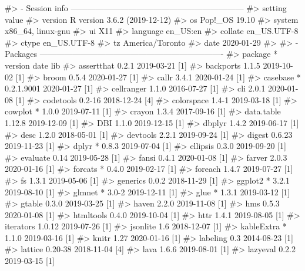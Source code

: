 \documentclass[
]{jss}
\begin{document}
\begin{CodeChunk}

\begin{CodeOutput}
#> - Session info ---------------------------------------------------------------
#>  setting  value                       
#>  version  R version 3.6.2 (2019-12-12)
#>  os       Pop!_OS 19.10               
#>  system   x86_64, linux-gnu           
#>  ui       X11                         
#>  language en_US:en                    
#>  collate  en_US.UTF-8                 
#>  ctype    en_US.UTF-8                 
#>  tz       America/Toronto             
#>  date     2020-01-29                  
#> 
#> - Packages -------------------------------------------------------------------
#>  package     * version    date       lib
#>  assertthat    0.2.1      2019-03-21 [1]
#>  backports     1.1.5      2019-10-02 [1]
#>  broom         0.5.4      2020-01-27 [1]
#>  callr         3.4.1      2020-01-24 [1]
#>  casebase    * 0.2.1.9001 2020-01-27 [1]
#>  cellranger    1.1.0      2016-07-27 [1]
#>  cli           2.0.1      2020-01-08 [1]
#>  codetools     0.2-16     2018-12-24 [4]
#>  colorspace    1.4-1      2019-03-18 [1]
#>  cowplot     * 1.0.0      2019-07-11 [1]
#>  crayon        1.3.4      2017-09-16 [1]
#>  data.table    1.12.8     2019-12-09 [1]
#>  DBI           1.1.0      2019-12-15 [1]
#>  dbplyr        1.4.2      2019-06-17 [1]
#>  desc          1.2.0      2018-05-01 [1]
#>  devtools      2.2.1      2019-09-24 [1]
#>  digest        0.6.23     2019-11-23 [1]
#>  dplyr       * 0.8.3      2019-07-04 [1]
#>  ellipsis      0.3.0      2019-09-20 [1]
#>  evaluate      0.14       2019-05-28 [1]
#>  fansi         0.4.1      2020-01-08 [1]
#>  farver        2.0.3      2020-01-16 [1]
#>  forcats     * 0.4.0      2019-02-17 [1]
#>  foreach       1.4.7      2019-07-27 [1]
#>  fs            1.3.1      2019-05-06 [1]
#>  generics      0.0.2      2018-11-29 [1]
#>  ggplot2     * 3.2.1      2019-08-10 [1]
#>  glmnet      * 3.0-2      2019-12-11 [1]
#>  glue        * 1.3.1      2019-03-12 [1]
#>  gtable        0.3.0      2019-03-25 [1]
#>  haven         2.2.0      2019-11-08 [1]
#>  hms           0.5.3      2020-01-08 [1]
#>  htmltools     0.4.0      2019-10-04 [1]
#>  httr          1.4.1      2019-08-05 [1]
#>  iterators     1.0.12     2019-07-26 [1]
#>  jsonlite      1.6        2018-12-07 [1]
#>  kableExtra  * 1.1.0      2019-03-16 [1]
#>  knitr         1.27       2020-01-16 [1]
#>  labeling      0.3        2014-08-23 [1]
#>  lattice       0.20-38    2018-11-04 [4]
#>  lava          1.6.6      2019-08-01 [1]
#>  lazyeval      0.2.2      2019-03-15 [1]

\end{CodeOutput}
\end{CodeChunk}
\end{document}
